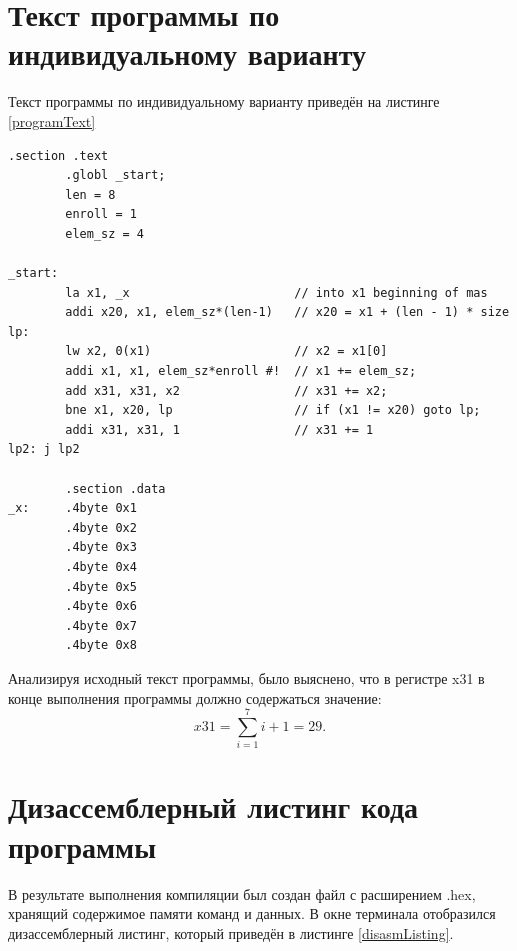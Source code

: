 \documentclass[12pt]{report}
\begin{document}
\section{Текст программы по индивидуальному варианту}
Текст программы по индивидуальному варианту приведён на листинге \ref{programText}
\begin{lstlisting}[label=programText,caption=Текст программы по индивидуальному варианту]
        .section .text
        .globl _start;
        len = 8
        enroll = 1 
        elem_sz = 4 

_start:
        la x1, _x                       // into x1 beginning of mas
        addi x20, x1, elem_sz*(len-1)   // x20 = x1 + (len - 1) * size
lp:
        lw x2, 0(x1)                    // x2 = x1[0]
        addi x1, x1, elem_sz*enroll #!  // x1 += elem_sz;
        add x31, x31, x2                // x31 += x2;
        bne x1, x20, lp                 // if (x1 != x20) goto lp;
        addi x31, x31, 1                // x31 += 1
lp2: j lp2

        .section .data
_x:     .4byte 0x1
        .4byte 0x2
        .4byte 0x3
        .4byte 0x4
        .4byte 0x5
        .4byte 0x6
        .4byte 0x7
        .4byte 0x8
\end{lstlisting}

Анализируя исходный текст программы, было выяснено, что в регистре x31 в конце выполнения программы должно содержаться значение:
\begin{displaymath}
x31 = \sum\limits_{i=1}^7{i} + 1 = 29.
\end{displaymath}

\section{Дизассемблерный листинг кода программы}
В результате выполнения компиляции был создан файл с расширением .hex, хранящий содержимое памяти команд и данных. В окне терминала отобразился дизассемблерный листинг, который приведён в листинге \ref{disasmListing}.
\end{document}
